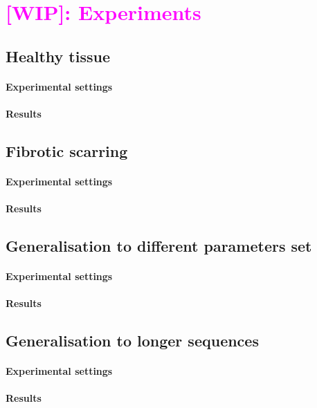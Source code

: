 \documentclass{article}
\newcommand{\WIP}[1]{\textcolor{magenta}{[WIP]: #1}}
\begin{document}
    
    \section{\WIP{Experiments}}
        \subsection{Healthy tissue}%
            \paragraph{Experimental settings}
            \paragraph{Results}
        \subsection{Fibrotic scarring}%
            \paragraph{Experimental settings}
            \paragraph{Results}
        \subsection{Generalisation to different parameters set}
            \paragraph{Experimental settings}
            \paragraph{Results}
        \subsection{Generalisation to longer sequences}
            \paragraph{Experimental settings}
            \paragraph{Results}
\end{document}
